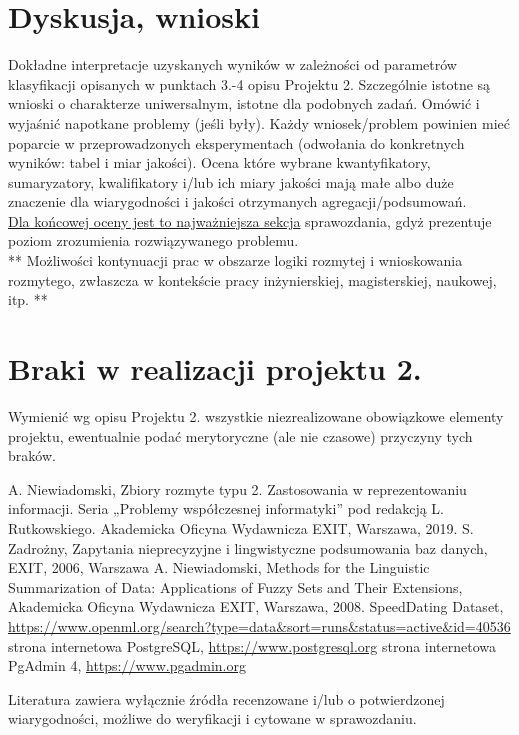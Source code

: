 \documentclass{classrep}
\begin{document}


\section{Dyskusja, wnioski}
Dokładne interpretacje uzyskanych wyników w zależności od parametrów klasyfikacji
opisanych w punktach 3.-4 opisu Projektu 2. 
Szczególnie istotne są wnioski o charakterze uniwersalnym, istotne dla podobnych zadań. 
Omówić i wyjaśnić napotkane problemy (jeśli były). Każdy wniosek/problem powinien mieć poparcie
w przeprowadzonych eksperymentach (odwołania do konkretnych wyników: tabel i miar
jakości). Ocena które wybrane kwantyfikatory, sumaryzatory, kwalifikatory i/lub ich
miary jakości mają małe albo duże znaczenie dla wiarygodności i jakości otrzymanych
agregacji/podsumowań.  \\
\underline{Dla końcowej oceny jest to najważniejsza sekcja} sprawozdania, gdyż prezentuje poziom
zrozumienia rozwiązywanego problemu.\\

** Możliwości kontynuacji prac w obszarze logiki rozmytej i wnioskowania rozmytego, zwłaszcza w kontekście pracy inżynierskiej,
magisterskiej, naukowej, itp. **\\



\section{Braki w realizacji projektu 2.}
Wymienić wg opisu Projektu 2. wszystkie niezrealizowane obowiązkowe elementy projektu, ewentualnie
podać merytoryczne (ale nie czasowe) przyczyny tych braków. 


\begin{thebibliography}{99}
  A. Niewiadomski, Zbiory rozmyte typu 2. Zastosowania w reprezentowaniu informacji.  Seria „Problemy współczesnej informatyki” pod redakcją L. Rutkowskiego. Akademicka Oficyna Wydawnicza EXIT, Warszawa, 2019.
 S. Zadrożny, Zapytania nieprecyzyjne i lingwistyczne podsumowania baz danych, EXIT, 2006, Warszawa
 A. Niewiadomski, Methods for the Linguistic Summarization of Data: Applications of Fuzzy Sets and Their Extensions, Akademicka Oficyna Wydawnicza EXIT, Warszawa, 2008.
 SpeedDating Dataset, \url{https://www.openml.org/search?type=data&sort=runs&status=active&id=40536}
 strona internetowa PostgreSQL, \url{https://www.postgresql.org}
 strona internetowa PgAdmin 4, \url{https://www.pgadmin.org}
\end{thebibliography}

Literatura zawiera wyłącznie źródła recenzowane i/lub o potwierdzonej wiarygodności,
możliwe do weryfikacji i cytowane w sprawozdaniu. 
\end{document}
